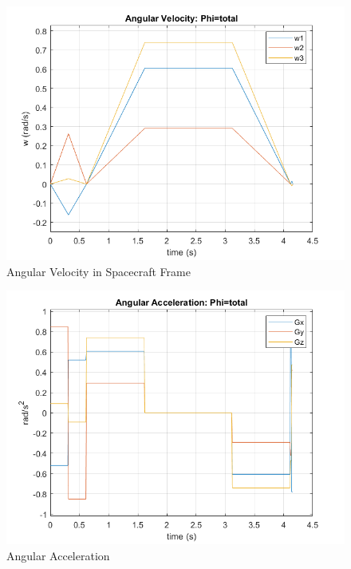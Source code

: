 \documentclass[letterpaper, preprint, paper,11pt]{AAS}	%
\begin{document}
			
			\begin{figure}[H]
				\label{fig:ang_vel_phi_total_alpha0}
				\begin{center}
					\includegraphics[width=4.5in]{figures/alpha0/ang_vel.png}
				\end{center}
				\caption{Angular Velocity in Spacecraft Frame}
			\end{figure}
			
			
			\begin{figure}[H]
				\label{fig:ang_accel_total_alpha0}
				\begin{center}
					\includegraphics[width=4.5in]{figures/alpha0/ang_accel.png}
				\end{center}
				\caption{Angular Acceleration}
			\end{figure}
			
\end{document}
